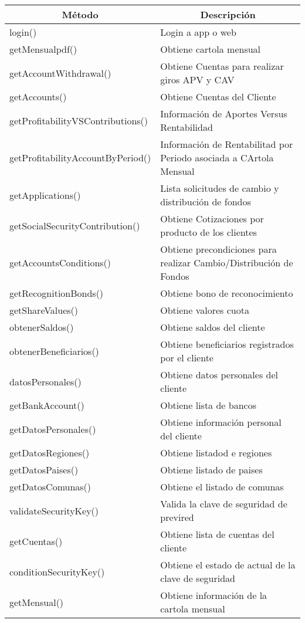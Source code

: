 \begin{tabular}{|p{6cm}|p{8cm}|}
    \hline
    \multicolumn{1}{|c|}{\textbf{Método}} & \multicolumn{1}{c|}{\textbf{Descripción}} \\
    \hline
    login() & Login a app o web \\
    getMensualpdf() &	Obtiene cartola mensual \\
    getAccountWithdrawal() &	Obtiene Cuentas para realizar giros APV y CAV \\
    getAccounts() &	Obtiene Cuentas del Cliente \\
    getProfitabilityVSContributions() &	Información de Aportes Versus Rentabilidad \\
    getProfitabilityAccountByPeriod() &	Información de Rentabilitad por Periodo asociada a CArtola Mensual \\
    getApplications() &	Lista solicitudes de cambio y distribución de fondos \\
    getSocialSecurityContribution() &	Obtiene Cotizaciones por producto de los clientes \\
    getAccountsConditions() &	Obtiene precondiciones para realizar Cambio/Distribución de Fondos \\
    getRecognitionBonds() &	Obtiene bono de reconocimiento \\
    getShareValues() &	Obtiene valores cuota \\
    obtenerSaldos() &	Obtiene saldos del cliente \\
    obtenerBeneficiarios() &	Obtiene beneficiarios registrados por el cliente \\
    datosPersonales() &	Obtiene datos personales del cliente \\
    getBankAccount() &	Obtiene lista de bancos \\
    getDatosPersonales() &	Obtiene información personal del cliente \\
    getDatosRegiones() &	Obtiene listadod e regiones \\
    getDatosPaises() &	Obtiene listado de paises \\
    getDatosComunas() &	Obtiene el listado de comunas \\
    validateSecurityKey() &	Valida la clave de seguridad de previred \\
    getCuentas() &	Obtiene lista de cuentas del cliente \\
    conditionSecurityKey() &	Obtiene el estado de actual de la clave de seguridad \\
    getMensual() &	Obtiene información de la cartola mensual \\

\end{tabular}
